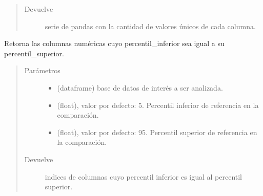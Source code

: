 \documentclass[letterpaper,10pt,openany,spanish]{sphinxmanual}
\begin{document}
\begin{fulllineitems}
\begin{fulllineitems}
\begin{quote}
\begin{description}
\item[{Devuelve}] \leavevmode
serie de pandas con la cantidad de valores únicos de cada columna.

\end{description}\end{quote}

\end{fulllineitems}


\begin{fulllineitems}
\label{\detokenize{calidad_datos:calidad_datos.CalidadDatos.VarianzaEnPercentil}}
Retorna las columnas numéricas cuyo percentil\_inferior sea igual             a su percentil\_superior.
\begin{quote}\begin{description}
\item[{Parámetros}] \leavevmode\begin{itemize}
\item {} 
 \textendash{} (dataframe) base de datos de interés a ser analizada.

\item {} 
 \textendash{} (float), valor por defecto: 5. Percentil             inferior de referencia en la comparación.

\item {} 
 \textendash{} (float), valor por defecto: 95. Percentil             superior de referencia en la comparación.

\end{itemize}

\item[{Devuelve}] \leavevmode
indices de columnas cuyo percentil inferior es igual al             percentil superior.

\end{description}\end{quote}

\end{fulllineitems}


\begin{fulllineitems}
\label{\detokenize{calidad_datos:calidad_datos.CalidadDatos.correlacion_cramerv}}
\end{fulllineitems}


\end{fulllineitems}
\end{document}
